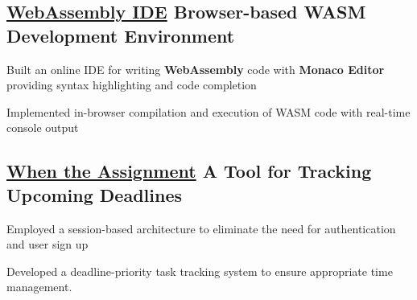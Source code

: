 \subsection{\href{https://wasm.arian.gg/}{WebAssembly IDE} \textbar{} Browser-based WASM Development Environment}
\begin{zitemize}
    \item Built an online IDE for writing \textbf{WebAssembly} code with \textbf{Monaco Editor} providing syntax highlighting and code completion
    \item Implemented in-browser compilation and execution of WASM code with real-time console output
\end{zitemize}

\vspace{0.3cm}
\subsection{\href{https://mcwta.vercel.app/}{When the Assignment} \textbar{} A Tool for Tracking Upcoming Deadlines}
\begin{zitemize}
    \item Employed a session-based architecture to eliminate the need for authentication and user sign up
    \item Developed a deadline-priority task tracking system to ensure appropriate time management.
\end{zitemize}





